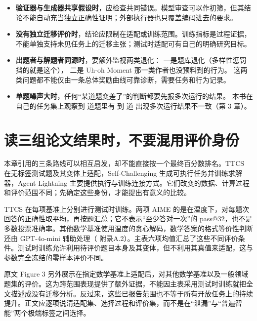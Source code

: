 \begin{itemize}
\sloppy
  \item \textbf{验证器与生成器共享假设时}，应检查共同错误。模型审查可以作初筛，但其结论不能自动充当独立正确性证明；外部执行器也只覆盖编码进去的要求。
  \item \textbf{没有独立迁移评价时}，结论应限制在适配或训练范围。训练指标是过程证据，不能单独支持未见任务上的迁移主张；测试时适配可有自己的明确研究目标。
  \item \textbf{出题者与解题者同源时}，要额外监视两类退化：
        一是题库退化（多样性惩罚挡的就是这个），
        二是 Uh-oh Moment 那一类作者也没预料到的行为。
        这两类问题都不能仅由一条总体奖励曲线可靠诊断，需要任务和行为记录。
  \item \textbf{单题噪声大时}，任何“某道题变差了”的判断都要先报多次运行的结果。
        本书在自己的任务集上观察到  道题里有  到  道
        出现多次运行结果不一致（第 3 章）。
\end{itemize}

\section{读三组论文结果时，不要混用评价身份}
\label{sec:ch11-resultidentity}

本章引用的三条路线可以相互启发，却不能直接按一个最终百分数排名。TTCS 在无标签测试题及其变体上适配，Self-Challenging 生成可执行任务并训练求解器，Agent Lightning 主要提供执行与训练连接方式。它们改变的数据、计算过程和评价范围不同；先确定这些身份，才能提出有意义的比较。

\begin{sloppypar}
TTCS 在每项基准上分别进行测试时训练。两项 AIME 的是在温度下，对每题次回答的正确性取平均，再按题汇总；它不表示“至少答对一次”的 pass@32，也不是多数投票准确率。其他数学基准使用温度的贪心解码，数学答案的格式等价性判断还由 GPT-4o-mini 辅助处理（\cite{ttcs-2601} 附录A.2）。主表六项均值汇总了这些不同评价条件。测试时训练允许利用待评价题目本身及其变体，但不利用其真值来适配，这与参数完全冻结的零样本评价不同。
\end{sloppypar}

原文 Figure 3 另外展示在指定数学基准上适配后，对其他数学基准以及一般领域题集的评价\cite{ttcs-2601}。这为跨范围表现提供了额外证据，不能因主表采用测试时训练就把全文描述成没有迁移分析。反过来，这些已报告范围也不等于所有开放任务上的持续提升。正文应逐项说清适配集、选择过程和评价集，而不是在“泄漏”与“普遍智能”两个极端标签之间选择。

